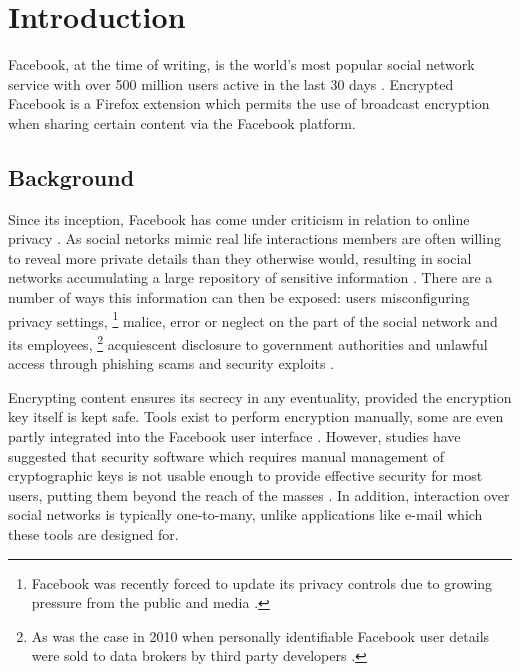 \chapter{Introduction}\label{ch:introduction}

Facebook, at the time of writing, is the world's most popular social network service with over 500 million users active in the last 30 days \cite{fb-factsheet}. Encrypted Facebook is a Firefox extension which permits the use of broadcast encryption when sharing certain content via the Facebook platform.


\section{Background}
\label{sec:background}

Since its inception, Facebook has come under criticism in relation to online privacy \cite{fb-cipc}. As social netorks mimic real life interactions members are often willing to reveal more private details than they otherwise would, resulting in social networks accumulating a large repository of sensitive information \cite{gross}. There are a number of ways this information can then be exposed: users misconfiguring privacy settings, \footnote{Facebook was recently forced to update its privacy controls due to growing pressure from the public and media \cite{fb-priv}.} malice, error or neglect on the part of the social network and its employees, \footnote{As was the case in 2010 when personally identifiable Facebook user details were sold to data brokers by third party developers \cite{fb-ids}.} acquiescent disclosure to government authorities and unlawful access through phishing scams and security exploits \cite{snoop} \cite{fb-gov} \cite{fb-phish} \cite{rockyou}.

Encrypting content ensures its secrecy in any eventuality, provided the encryption key itself is kept safe. Tools exist to perform encryption manually, some are even partly integrated into the Facebook user interface \cite{firegpg}. However, studies have suggested that security software which requires manual management of cryptographic keys is not usable enough to provide effective security for most users, putting them beyond the reach of the masses \cite{johhny}. In addition, interaction over social networks is typically one-to-many, unlike applications like e-mail which these tools are designed for.


